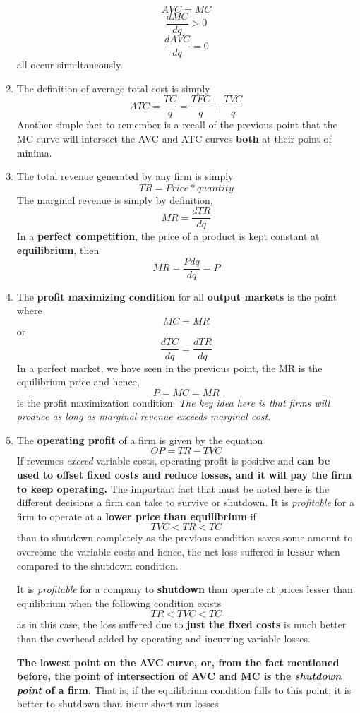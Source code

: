 \documentclass[12pt]{article}
\begin{document}
\begin{enumerate}
$$AVC = MC $$$$ \frac{dMC}{dq} > 0$$
$$\frac{dAVC}{dq} = 0$$
all occur simultaneously.
\item The definition of average total cost is simply $$ATC = \frac{TC}{q} = \frac{TFC}{q} + \frac{TVC}{q}$$ Another simple fact to remember is a recall of the previous point that the MC curve will intersect the AVC and ATC curves \textbf{both} at their point of minima.
\item The total revenue generated by any firm is simply 
$$TR = Price*quantity$$
The marginal revenue is simply by definition, 
$$MR = \frac{dTR}{dq}$$ In a \textbf{perfect competition}, the price of a product is kept constant at \textbf{equilibrium}, then
$$MR = \frac{Pdq}{dq} = P$$
\item The \textbf{profit maximizing condition} for all  \textbf{output markets} is the point where $$MC = MR$$ or
$$\frac{dTC}{dq} = \frac{dTR}{dq}$$ In a perfect market, we have seen in the previous point, the MR is the equilibrium price and hence, 
$$P = MC = MR$$ is the profit maximization condition. \textit{The key idea here is that firms will produce as long as marginal revenue exceeds marginal cost.}
\item The \textbf{operating profit} of a firm is given by the equation $$OP = TR - TVC$$
If revenues \textit{exceed} variable costs, operating profit is positive and \textbf{can be used to offset fixed costs and reduce losses, and it will pay the firm to keep operating.}
The important fact that must be noted here is the different decisions a firm can take to survive or shutdown. It is \textit{profitable} for a firm to operate at a \textbf{lower price than equilibrium} if $$TVC<TR<TC$$ than to shutdown completely as the previous condition saves some amount to overcome the variable costs and hence, the net loss suffered is \textbf{lesser} when compared to the shutdown condition.

It is \textit{profitable} for a company to \textbf{shutdown} than operate at prices lesser than equilibrium when the following condition exists 
$$TR<TVC<TC$$
as in this case, the loss suffered due to \textbf{just the fixed costs} is much better than the overhead added by operating and incurring variable losses.

\textbf{The lowest point on the AVC curve, or, from the fact mentioned before, the point of intersection of AVC and MC is the \textit{shutdown point} of a firm.} That is, if the equilibrium condition falls to this point, it is better to shutdown than incur short run losses.


\end{enumerate}
\end{document}
